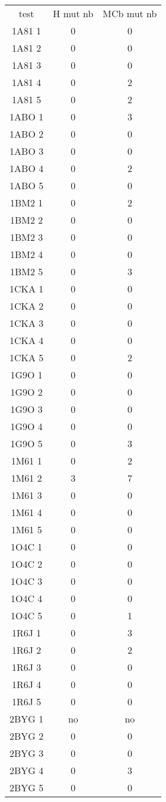 \begin{table}[h]
\begin{minipage}[t]{.4\linewidth}
{\begin{tabular}{ccc}
        \toprule
        test & H mut nb & MCb mut nb \\
        \cmidrule{1-3}
        1A81 1 & 0  & 0 \\    
        1A81 2 & 0  & 0 \\
        1A81 3 & 0  & 0 \\
        1A81 4 & 0  & 2 \\
        1A81 5 & 0  & 2 \\
        1ABO 1 & 0  & 3 \\ 
        1ABO 2 & 0  & 0 \\
        1ABO 3 & 0  & 0 \\
        1ABO 4 & 0  & 2 \\
        1ABO 5 & 0  & 0 \\
        1BM2 1 & 0  & 2 \\
        1BM2 2 & 0  & 0 \\
        1BM2 3 & 0  & 0 \\
        1BM2 4 & 0  & 0 \\
        1BM2 5 & 0  & 3 \\
        1CKA 1 & 0  & 0 \\
        1CKA 2 & 0  & 0 \\
        1CKA 3 & 0  & 0 \\
        1CKA 4 & 0  & 0 \\
        1CKA 5 & 0  & 2 \\
        1G9O 1 & 0  & 0 \\
        1G9O 2 & 0  & 0 \\
        1G9O 3 & 0  & 0 \\
        1G9O 4 & 0  & 0 \\
        1G9O 5 & 0  & 3 \\
        1M61 1 & 0  & 2 \\
        1M61 2 & 3  & 7 \\
        1M61 3 & 0  & 0 \\
        1M61 4 & 0  & 0 \\
        1M61 5 & 0  & 0 \\
        1O4C 1 & 0  & 0 \\
        1O4C 2 & 0  & 0 \\
        1O4C 3 & 0  & 0 \\
        1O4C 4 & 0  & 0 \\
        1O4C 5 & 0  & 1 \\
        1R6J 1 & 0  & 3 \\
        1R6J 2 & 0  & 2 \\
        1R6J 3 & 0  & 0 \\
        1R6J 4 & 0  & 0 \\
        1R6J 5 & 0  & 0 \\
        2BYG 1 & no & no \\ 
        2BYG 2 & 0  & 0 \\
        2BYG 3 & 0  & 0 \\
        2BYG 4 & 0  & 3 \\
        2BYG 5 & 0  & 0 \\        
        \bottomrule


\end{tabular}}
\end{minipage}
\end{table}
